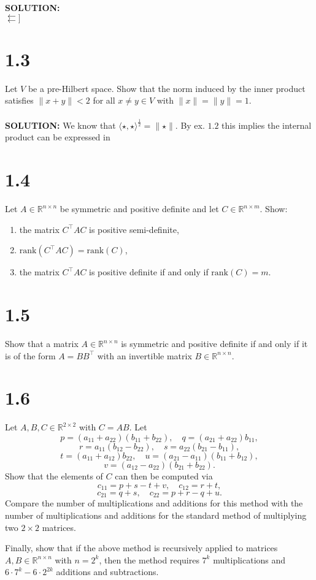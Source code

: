 \documentclass{article}
\begin{document}
\noindent \textbf{SOLUTION: }\\
$\leftleftarrows]$

\section*{1.3}
Let $V$ be a pre-Hilbert space. Show that the norm induced by the inner product satisfies $\|x + y\| < 2$ for all $x \neq y \in V$ with $\|x\| = \|y\| = 1$.
\\
\\
\noindent \textbf{SOLUTION: }
We know that $\langle \star, \star \rangle^{\frac{1}{2}} =  \| \star \|$. By ex. $1.2$ this implies the internal product can be expressed in 
\section*{1.4}
Let $A \in \mathbb{R}^{n \times n}$ be symmetric and positive definite and let $C \in \mathbb{R}^{n \times m}$. Show:
\begin{enumerate}
    \item the matrix $C^\top AC$ is positive semi-definite,
    \item $\text{rank}(C^\top AC) = \text{rank}(C)$,
    \item the matrix $C^\top AC$ is positive definite if and only if $\text{rank}(C) = m$.
\end{enumerate}

\section*{1.5}
Show that a matrix $A \in \mathbb{R}^{n \times n}$ is symmetric and positive definite if and only if it is of the form $A = B B^\top$ with an invertible matrix $B \in \mathbb{R}^{n \times n}$.

\section*{1.6}
Let $A, B, C \in \mathbb{R}^{2 \times 2}$ with $C = AB$. Let
\[
p = (a_{11} + a_{22})(b_{11} + b_{22}), \quad q = (a_{21} + a_{22})b_{11},
\]
\[
r = a_{11}(b_{12} - b_{22}), \quad s = a_{22}(b_{21} - b_{11}),
\]
\[
t = (a_{11} + a_{12})b_{22}, \quad u = (a_{21} - a_{11})(b_{11} + b_{12}),
\]
\[
v = (a_{12} - a_{22})(b_{21} + b_{22}).
\]
Show that the elements of $C$ can then be computed via
\[
c_{11} = p + s - t + v, \quad c_{12} = r + t,
\]
\[
c_{21} = q + s, \quad c_{22} = p + r - q + u.
\]
Compare the number of multiplications and additions for this method with the number of multiplications and additions for the standard method of multiplying two $2 \times 2$ matrices.

Finally, show that if the above method is recursively applied to matrices $A, B \in \mathbb{R}^{n \times n}$ with $n = 2^k$, then the method requires $7^k$ multiplications and $6 \cdot 7^k - 6 \cdot 2^{2k}$ additions and subtractions.
\end{document}
